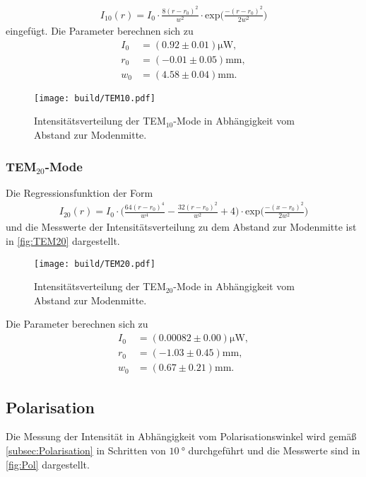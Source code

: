 \begin{align*}
  I_{10}(r) = I_0 \cdot \frac{8(r-r_0)^2}{w^2} \cdot \text{exp}\Biggl(\frac{-(r-r_0)^2}{2 w^2}\Biggr)
\end{align*}
eingefügt. Die Parameter berechnen sich zu
\begin{align*}
  I_{0} &= (0.92 \pm 0.01) \si{\micro\W},\\
  r_0 &= (-0.01 \pm 0.05) \si{\milli\meter},\\
  w_0 &= (4.58 \pm 0.04) \si{\milli\meter}.
\end{align*}

\begin{figure}[H]
  \centering
  \texttt{[image: build/TEM10.pdf]}
  \caption {Intensitätsverteilung der TEM$_{10}$-Mode in Abhängigkeit vom Abstand zur Modenmitte.}
  \label{fig:TEM10}
\end{figure}

\subsubsection{TEM$_{20}$-Mode}
\label{subsubsec:20Mode}
Die Regressionsfunktion der Form
\begin{align*}
  I_{20}(r) = I_0 \cdot \Biggl(\frac{64(r-r_0)^4}{w^4}-\frac{32(r-r_0)^2}{w^2}+4\Biggr) \cdot \text{exp}\Biggl(\frac{-(x-r_0)^2}{2 w^2}\Biggr)
\end{align*}
und die Messwerte der Intensitätsverteilung zu dem Abstand zur Modenmitte ist in \autoref{fig:TEM20} dargestellt.
\begin{figure}[H]
  \centering
  \texttt{[image: build/TEM20.pdf]}
  \caption {Intensitätsverteilung der TEM$_{20}$-Mode in Abhängigkeit vom Abstand zur Modenmitte.}
  \label{fig:TEM20}
\end{figure}

Die Parameter berechnen sich zu
\begin{align*}
  I_{0} &= (0.00082 \pm 0.00) \si{\micro\W},\\
  r_0 &= (-1.03 \pm 0.45) \si{\milli\meter},\\
  w_0 &= (0.67 \pm 0.21) \si{\milli\meter}.
\end{align*}

\subsection{Polarisation}
\label{sub:Polarisation}

Die Messung der Intensität in Abhängigkeit vom Polarisationswinkel wird gemäß \autoref{subsec:Polarisation}
in Schritten von $\qty{10}{\degree}$ durchgeführt und die Messwerte sind in
\autoref{fig:Pol} dargestellt.


